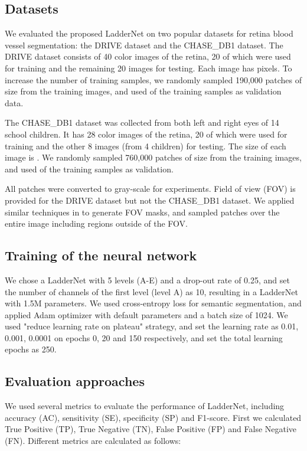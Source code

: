 \documentclass{article}
\begin{document}
\subsection{Datasets}
We evaluated the proposed LadderNet on two popular datasets for retina blood vessel segmentation: the DRIVE dataset and the CHASE\_DB1 dataset. The DRIVE dataset consists of 40 color images of the retina, 20 of which were used for training and the remaining 20 images for testing. Each image has  pixels. To increase the number of training samples, we randomly sampled 190,000 patches of size  from the training images, and used  of the training samples as validation data. 
\par 
The CHASE\_DB1 dataset was collected from both left and right eyes of 14 school children. It has 28 color images of the retina, 20 of which were used for training and the other 8 images (from 4 children) for testing. The size of each image is . We randomly sampled 760,000 patches of size  from the training images, and used  of the training samples as validation. 
\par
All patches were converted to gray-scale for experiments. Field of view (FOV) is provided for the DRIVE dataset but not the CHASE\_DB1 dataset. We applied similar techniques in \cite{soares2006retinal} to generate FOV masks, and sampled patches over the entire image including regions outside of the FOV. 

\subsection{Training of the neural network}
We chose a LadderNet with 5 levels (A-E) and a drop-out rate of 0.25, and set the number of channels of the first level (level A) as 10, resulting in a LadderNet with 1.5M parameters. We used cross-entropy loss for semantic segmentation, and applied Adam optimizer with default parameters and a batch size of 1024. We used "reduce learning rate on plateau" strategy, and set the learning rate as 0.01, 0.001, 0.0001 on epochs 0, 20 and 150 respectively, and set the total learning epochs as 250. 

\subsection{Evaluation approaches}
We used several metrics to evaluate the performance of LadderNet, including accuracy (AC), sensitivity (SE), specificity (SP) and F1-score. First we calculated True Positive (TP), True Negative (TN), False Positive (FP) and False Negative (FN). Different metrics are calculated as follows:
\end{document}
